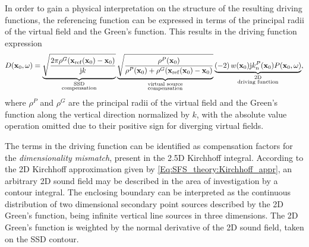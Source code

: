 In order to gain a physical interpretation on the structure of the resulting driving functions, the referencing function can be expressed in terms of the principal radii of the virtual field and the Green's function. 
This results in the driving function expression
\begin{equation}
D(\mathbf{x}_0, \omega) = 
\underbrace{\sqrt{\frac{2\pi \rho^G(\mathbf{x}_{\mathrm{ref}}(\mathbf{x}_0)-\mathbf{x}_0) }{\mathrm{j} k}}}_{{\substack{\text{SSD}\\\text{compensation}}}}
\underbrace{\sqrt{ \frac{\rho^P(\mathbf{x}_0) }{\rho^P(\mathbf{x}_0) +  \rho^G(\mathbf{x}_{\mathrm{ref}}(\mathbf{x}_0)-\mathbf{x}_0) } }}_{{\substack{\text{virtual source}\\\text{compensation}}}}
\underbrace{\left(-2\right) w(\mathbf{x}_0)  \mathrm{j} k_{\mathrm{n}}^P(\mathbf{x}_0) 	P(\mathbf{x}_0,\omega)}_{\substack{\text{2D}\\\text{driving function}}},
\end{equation}
where $\rho^P$ and $\rho^G$ are the principal radii of the virtual field and the Green's function along the vertical direction normalized by $k$, with the absolute value operation omitted due to their positive sign for diverging virtual fields.

The terms in the driving function can be identified as compensation factors for the \emph{dimensionality mismatch}, present in the 2.5D Kirchhoff integral.
According to the 2D Kirchhoff approximation given by \eqref{Eq:SFS_theory:Kirchhoff_appr}, an arbitrary 2D sound field may be described in the area of investigation by a contour integral.
The enclosing boundary can be interpreted as the continuous distribution of two dimensional secondary point sources described by the 2D Green's function, being infinite vertical line sources in three dimensions.
The 2D Green's function is weighted by the normal derivative of the 2D sound field, taken on the SSD contour.

